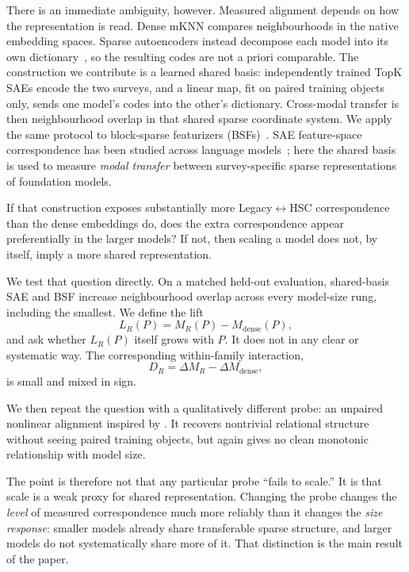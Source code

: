 \documentclass[11pt]{article}
\begin{document}
There is an immediate ambiguity, however.
Measured alignment depends on how the representation is read.
Dense mKNN compares neighbourhoods in the native embedding spaces.
Sparse autoencoders instead decompose each model into its own dictionary~\citep{gao2025sae}, so the resulting codes are not a priori comparable.
The construction we contribute is a learned shared basis: independently trained TopK SAEs encode the two surveys, and a linear map, fit on paired training objects only, sends one model's codes into the other's dictionary.
Cross-modal transfer is then neighbourhood overlap in that shared sparse coordinate system.
We apply the same protocol to block-sparse featurizers (BSFs)~\citep{fel2026bsf}.
SAE feature-space correspondence has been studied across language models~\citep{lan2024saeuniversality}; here the shared basis is used to measure \emph{modal transfer} between survey-specific sparse representations of foundation models.

If that construction exposes substantially more Legacy\(\leftrightarrow\)HSC correspondence than the dense embeddings do, does the extra correspondence appear preferentially in the larger models?
If not, then scaling a model does not, by itself, imply a more shared representation.

We test that question directly.
On a matched held-out evaluation, shared-basis SAE and BSF increase neighbourhood overlap across every model-size rung, including the smallest.
We define the lift
\[
L_R(P)=M_R(P)-M_{\mathrm{dense}}(P),
\]
and ask whether \(L_R(P)\) itself grows with \(P\).
It does not in any clear or systematic way.
The corresponding within-family interaction,
\[
D_R=\Delta M_R-\Delta M_{\mathrm{dense}},
\]
is small and mixed in sign.

We then repeat the question with a qualitatively different probe: an unpaired nonlinear alignment inspired by \citet{jha2025vec2vec}.
It recovers nontrivial relational structure without seeing paired training objects, but again gives no clean monotonic relationship with model size.

The point is therefore not that any particular probe ``fails to scale.''
It is that scale is a weak proxy for shared representation.
Changing the probe changes the \emph{level} of measured correspondence much more reliably than it changes the \emph{size response}: smaller models already share transferable sparse structure, and larger models do not systematically share more of it.
That distinction is the main result of the paper.
\end{document}
